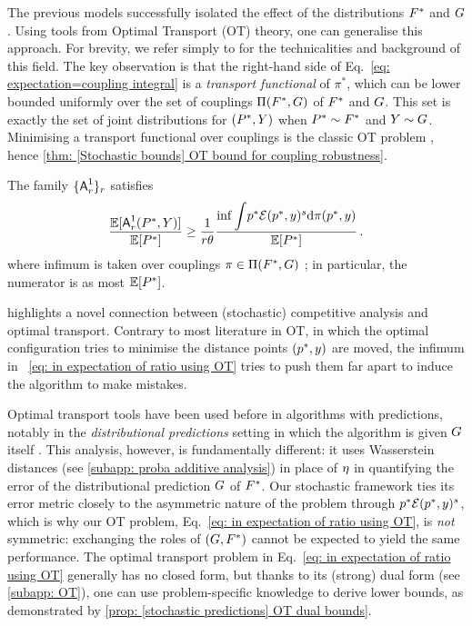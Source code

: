 The previous models successfully isolated the effect of the distributions $F^*$ and $G$. Using tools from Optimal Transport (OT) theory, one can generalise this approach. For brevity, we refer simply to \cite{villani_optimal_2009} for the technicalities and background of this field. The key observation is that the right-hand side of Eq.~\eqref{eq: expectation=coupling integral} is a \emph{transport functional} of $\pi^*$, which can be lower bounded uniformly over the set of couplings $\Pi(F^*,G)$  of $F^*$ and $G$. This set is exactly the set of joint distributions for $(P^*,Y)$ when $P^*\sim F^*$ and $Y\sim G$. Minimising a transport functional over couplings is the classic OT problem \citep{villani_optimal_2009}, hence \cref{thm: [Stochastic bounds] OT bound for coupling robustness}.


\begin{theorem}\label{thm: [Stochastic bounds] OT bound for coupling robustness}
    The family $\{\mbox{\textup{\textsf{A}}}^1_r\}_{r}$ satisfies 
        \begin{align}
        \frac{\Eb[\algone(\Price,\Pred)]}{\Eb[\Price]}\ge \frac{1}{r\theta}\frac{\inf\mathlarger{\int} \price\error(\price,\pred)^{\smth}\de\coupling(\price,\pred)}{\Eb[\Price]}\label{eq: in expectation of ratio using OT}\,.
    \end{align}
    where infimum is taken over couplings $\pi\in\Pi(F^*,G)$ ; in particular, the numerator is as most $\mathbb{E}[P^*]$.
\end{theorem}

 highlights a novel connection between (stochastic) competitive analysis and optimal transport.
Contrary to most literature in OT, in which the optimal configuration tries to minimise the distance points $(p^*,y)$ are moved, the infimum in ~\eqref{eq: in expectation of ratio using OT} tries to push them far apart to induce the algorithm to make mistakes.

Optimal transport tools have been used before in algorithms with predictions, notably in the \emph{distributional predictions} setting in which the algorithm is given $G$ itself \citep{angelopoulos_contract_2024,dinitz_binary_2024}. This analysis, however, is fundamentally different: it uses Wasserstein distances (see \cref{subapp: proba additive analysis}) in place of $\eta$ in quantifying the error of the distributional prediction $G$ of $F^*$. Our stochastic framework ties its error metric closely to the asymmetric nature of the problem through $p^*\mathcal{E}(p^*,y)^s$, which is why our OT problem, \ie Eq.~\eqref{eq: in expectation of ratio using OT}, is \emph{not} symmetric: exchanging the roles of $(G,F^*)$ cannot be expected to yield the same performance. 
The optimal transport problem in Eq.~\eqref{eq: in expectation of ratio using OT} generally has no closed form, but thanks to its (strong) dual form (see \cref{subapp: OT}), one can use problem-specific knowledge to derive lower bounds, as demonstrated by \cref{prop: [stochastic predictions] OT dual bounds}.

